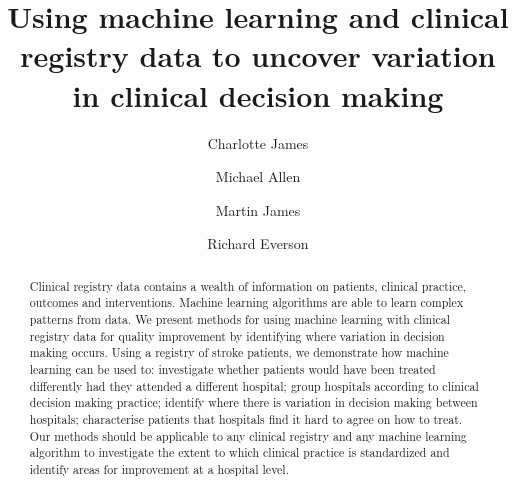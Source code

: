 \documentclass[12pt,a4paper, pdftex]{elsarticle}
\begin{document}
\begin{frontmatter}


\title{Using machine learning and clinical registry data to uncover variation in clinical decision making}

\author[inst1]{Charlotte James}

\author[inst1,inst2]{Michael Allen}

\author[inst1,inst3]{Martin James}

\author[inst4]{Richard Everson}




            

\begin{abstract}
Clinical registry data contains a wealth of information on patients, clinical practice, outcomes and interventions. Machine learning algorithms are able to learn complex patterns from data. 
%
We present methods for using machine learning with clinical registry data for quality improvement by identifying where variation in decision making occurs. Using a registry of stroke patients, we demonstrate how machine learning can be used to: investigate whether patients would have been treated differently had they attended a different hospital; group hospitals according to clinical decision making practice; identify where there is variation in decision making between hospitals; characterise patients that hospitals find it hard to agree on how to treat.
%
Our methods should be applicable to any clinical registry and any machine learning algorithm to investigate the extent to which clinical practice is standardized and identify areas for improvement at a hospital level.


\end{abstract}




\end{frontmatter}
\end{document}
